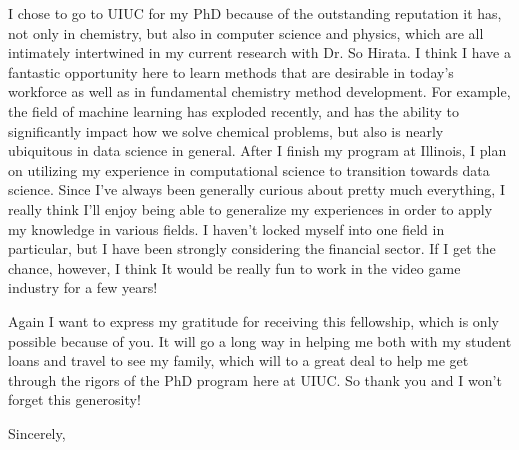 \documentclass[11pt,a4paper]{letter} %
\begin{document}
\begin{letter}
I chose to go to UIUC for my PhD because of the outstanding reputation it has, not only in chemistry, but also in computer science and physics, which are all intimately intertwined in my current research with Dr. So Hirata. I think I have a fantastic opportunity here to learn methods that are desirable in today's workforce as well as in fundamental chemistry method development. For example, the field of machine learning has exploded recently, and has the ability to significantly impact how we solve chemical problems, but also is nearly ubiquitous in data science in general. 
After I finish my program at Illinois, I plan on utilizing my experience in computational science to transition towards data science. Since I've always been generally curious about pretty much everything, I really think I'll enjoy being able to generalize my experiences in order to apply my knowledge in various fields. I haven't locked myself into one field in particular, but I have been strongly considering the financial sector. If I get the chance, however, I think It would be really fun to work in the video game industry for a few years!

Again I want to express my gratitude for receiving this fellowship, which is only possible because of you. It will go a long way in helping me both with my student loans and travel to see my family, which will to a great deal to help me get through the rigors of the PhD program here at UIUC. So thank you and I won't forget this generosity!

\closing{Sincerely,}
\end{letter}
\end{document}
